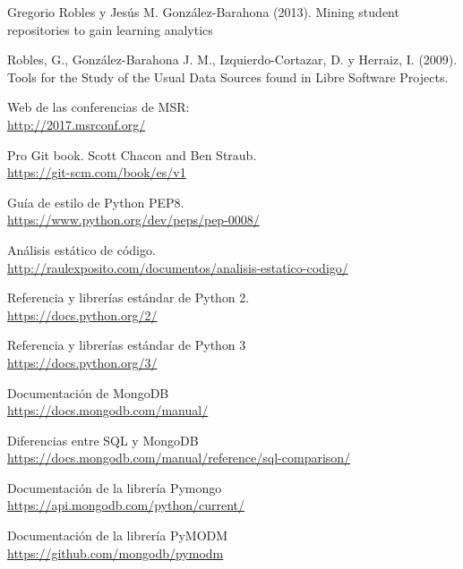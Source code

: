 
\cleardoublepage

\begin{thebibliography}{25}


 Gregorio Robles y Jesús M. González-Barahona (2013). Mining student repositories to gain learning analytics

 Robles, G., González-Barahona J. M., Izquierdo-Cortazar, D. y Herraiz, I. (2009). Tools for the Study of the Usual Data Sources found in Libre Software Projects.

 Web de las conferencias de MSR:   \\
{\footnotesize
\url{http://2017.msrconf.org/}} 

Pro Git book. Scott Chacon and Ben Straub.   \\
{\footnotesize
\url{https://git-scm.com/book/es/v1}} 

 Guía de estilo de Python PEP8.   \\
{\footnotesize
\url{https://www.python.org/dev/peps/pep-0008/}} 

Análisis estático de código.   \\
{\footnotesize
\url{http://raulexposito.com/documentos/analisis-estatico-codigo/}} 

Referencia y librerías estándar de Python 2.   \\
{\footnotesize
\url{https://docs.python.org/2/}} 

Referencia y librerías estándar de Python 3   \\
{\footnotesize
\url{https://docs.python.org/3/}} 

Documentación de MongoDB   \\
{\footnotesize
\url{https://docs.mongodb.com/manual/}} 

Diferencias entre SQL y MongoDB   \\
{\footnotesize
\url{https://docs.mongodb.com/manual/reference/sql-comparison/}} 

Documentación de la librería Pymongo   \\
{\footnotesize
\url{https://api.mongodb.com/python/current/}} 

Documentación de la librería PyMODM   \\
{\footnotesize
\url{https://github.com/mongodb/pymodm}} 


\end{thebibliography}
